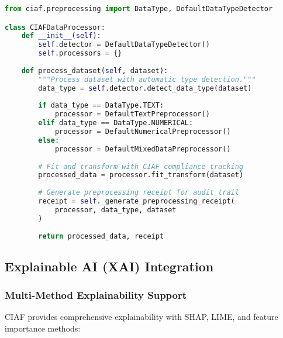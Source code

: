 \documentclass[12pt,a4paper]{article}
\begin{document}
\begin{lstlisting}[language=Python, caption=Data Type Detection Implementation]
from ciaf.preprocessing import DataType, DefaultDataTypeDetector

class CIAFDataProcessor:
    def __init__(self):
        self.detector = DefaultDataTypeDetector()
        self.processors = {}
    
    def process_dataset(self, dataset):
        """Process dataset with automatic type detection."""
        data_type = self.detector.detect_data_type(dataset)
        
        if data_type == DataType.TEXT:
            processor = DefaultTextPreprocessor()
        elif data_type == DataType.NUMERICAL:
            processor = DefaultNumericalPreprocessor()
        else:
            processor = DefaultMixedDataPreprocessor()
        
        # Fit and transform with CIAF compliance tracking
        processed_data = processor.fit_transform(dataset)
        
        # Generate preprocessing receipt for audit trail
        receipt = self._generate_preprocessing_receipt(
            processor, data_type, dataset
        )
        
        return processed_data, receipt
\end{lstlisting}

\subsection{Explainable AI (XAI) Integration}

\subsubsection{Multi-Method Explainability Support}

CIAF provides comprehensive explainability with SHAP, LIME, and feature importance methods:
\end{document}
